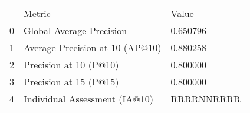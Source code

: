\begin{tabular}{lll}
 & Metric & Value \\
0 & Global Average Precision & 0.650796 \\
1 & Average Precision at 10 (AP@10) & 0.880258 \\
2 & Precision at 10 (P@10) & 0.800000 \\
3 & Precision at 15 (P@15) & 0.800000 \\
4 & Individual Assessment (IA@10) & RRRRNNRRRR \\
\end{tabular}
